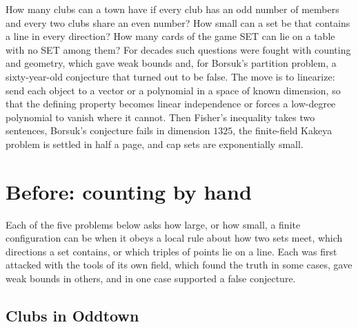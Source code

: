 \begin{refsection}

\newcommand{\dimensionSR}{\operatorname{sr}}

\begin{chaptersummary}
How many clubs can a town have if every club has an odd number of members and every two clubs share an even number? How small can a set be that contains a line in every direction? How many cards of the game SET can lie on a table with no SET among them? For decades such questions were fought with counting and geometry, which gave weak bounds and, for Borsuk's partition problem, a sixty-year-old conjecture that turned out to be false. The move is to linearize: send each object to a vector or a polynomial in a space of known dimension, so that the defining property becomes linear independence or forces a low-degree polynomial to vanish where it cannot. Then Fisher's inequality takes two sentences, Borsuk's conjecture fails in dimension $1325$, the finite-field Kakeya problem is settled in half a page, and cap sets are exponentially small.
\end{chaptersummary}

\section{Before: counting by hand}\label{sec:dimension:before}

Each of the five problems below asks how large, or how small, a finite configuration can be when it obeys a local rule about how two sets meet, which directions a set contains, or which triples of points lie on a line. Each was first attacked with the tools of its own field, which found the truth in some cases, gave weak bounds in others, and in one case supported a false conjecture.

\subsection{Clubs in Oddtown}\label{sec:dimension:oddtown-before}



\end{refsection}
